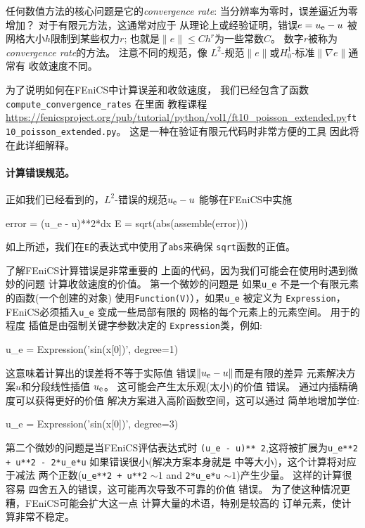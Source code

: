 
任何数值方法的核心问题是它的\emph{convergence rate}:
当分辨率为零时，误差逼近为零
增加？ 对于有限元方法，这通常对应于
从理论上或经验证明，错误$e = \uex - u$
被网格大小$h$限制到某些权力$r$; 也就是$\|e\|
\leq C h^r$为一些常数$C$。 数字$r$被称为
\emph{convergence rate}的方法。 注意不同的规范，像
$L^2$-规范$\|e\|$或$H^1_0$-标准$\|\nabla e\|$通常有
收敛速度不同。

为了说明如何在FEniCS中计算误差和收敛速度，
我们已经包含了函数\verb!compute_convergence_rates! 在里面
教程课程
\url{https://fenicsproject.org/pub/tutorial/python/vol1/ft10_poisson_extended.py}{\nolinkurl{ft10_poisson_extended.py}}。
这是一种在验证有限元代码时非常方便的工具
因此将在此详细解释。

\paragraph{计算错误规范。}

正如我们已经看到的，$L^2$-错误的规范$\uex - u$
能够在FEniCS中实施

\begin{python}
error = (u_e - u)**2*dx
E = sqrt(abs(assemble(error)))
\end{python}
如上所述，我们在\texttt{E}的表达式中使用了\texttt{abs}来确保
\texttt{sqrt}函数的正值。

了解FEniCS计算错误是非常重要的
上面的代码，因为我们可能会在使用时遇到微妙的问题
计算收敛速度的价值。 第一个微妙的问题是
如果\verb!u_e! 不是一个有限元素的函数(一个创建的对象)
使用\texttt{Function(V)}），如果\verb!u_e! 被定义为
\texttt{Expression}，FEniCS必须插入\verb!u_e! 变成一些局部有限的
网格的每个元素上的元素空间。 用于的程度
插值是由强制关键字参数决定的
\texttt{Expression}类，例如:

\begin{python}
u_e = Expression('sin(x[0])', degree=1)
\end{python}
这意味着计算出的误差将不等于实际值
错误$\|\uex - u\|$而是有限的差异
元素解决方案$u$和分段线性插值
$\uex$。 这可能会产生太乐观(太小)的价值
错误。 通过内插精确度可以获得更好的价值
解决方案进入高阶函数空间，这可以通过
简单地增加学位:

\begin{python}
u_e = Expression('sin(x[0])', degree=3)
\end{python}

第二个微妙的问题是当FEniCS评估表达式时
\verb!(u_e - u)** 2!,这将被扩展为\verb!u_e**2 + u**2 - 2*u_e*u! 如果错误很小(解决方案本身就是
中等大小)，这个计算将对应于减法
两个正数(\verb!u_e**2 + u**2! $\sim 1$ and \verb!2*u_e*u! $\sim
1$)产生少量。 这样的计算很容易
四舍五入的错误，这可能再次导致不可靠的价值
错误。 为了使这种情况更糟，FEniCS可能会扩大这一点
计算大量的术语，特别是较高的
订单元素，使计算非常不稳定。

